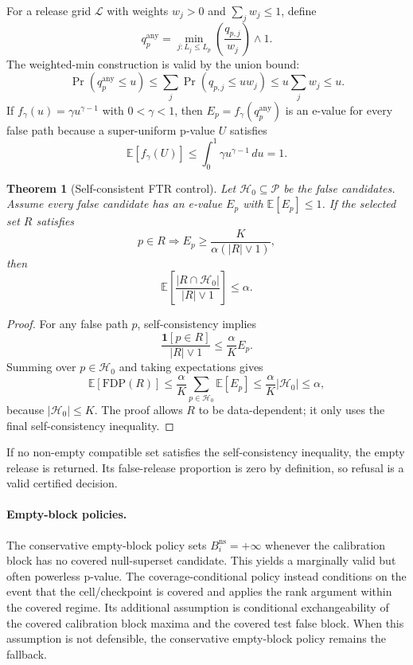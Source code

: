 \documentclass[11pt]{article}
\newtheorem{theorem}{Theorem}
\newcommand{\Pcal}{\mathcal P}
\newcommand{\Hcal}{\mathcal H}
\newcommand{\E}{\mathbb E}
\newcommand{\ind}{\mathbf 1}
\newcommand{\FDP}{\mathrm{FDP}}
\begin{document}
For a release grid \(\mathcal L\) with weights \(w_j>0\) and \(\sum_jw_j\le1\), define
\[
q_p^{\mathrm{any}}
=
\min_{j:L_j\le L_p}
\left(\frac{q_{p,j}}{w_j}\right)\wedge1 .
\]
The weighted-min construction is valid by the union bound:
\[
\Pr\!\left(q_p^{\mathrm{any}}\le u\right)
\le
\sum_j\Pr(q_{p,j}\le uw_j)
\le
u\sum_j w_j
\le u .
\]
If \(f_\gamma(u)=\gamma u^{\gamma-1}\) with \(0<\gamma<1\), then \(E_p=f_\gamma(q_p^{\mathrm{any}})\) is an e-value for every false path because a super-uniform p-value \(U\) satisfies
\[
\E[f_\gamma(U)]\le \int_0^1\gamma u^{\gamma-1}\,du=1 .
\]

\begin{theorem}[Self-consistent FTR control]
Let \(\Hcal_0\subseteq\Pcal\) be the false candidates.
Assume every false candidate has an e-value \(E_p\) with \(\E[E_p]\le1\).
If the selected set \(R\) satisfies
\[
p\in R\Rightarrow
E_p\ge \frac{K}{\alpha(|R|\vee1)},
\]
then
\[
\E\left[
\frac{|R\cap\Hcal_0|}{|R|\vee1}
\right]\le\alpha .
\]
\end{theorem}
\begin{proof}
For any false path \(p\), self-consistency implies
\[
\frac{\ind[p\in R]}{|R|\vee1}
\le
\frac{\alpha}{K}E_p .
\]
Summing over \(p\in\Hcal_0\) and taking expectations gives
\[
\E[\FDP(R)]
\le
\frac{\alpha}{K}\sum_{p\in\Hcal_0}\E[E_p]
\le
\frac{\alpha}{K}|\Hcal_0|
\le \alpha,
\]
because \(|\Hcal_0|\le K\).
The proof allows \(R\) to be data-dependent; it only uses the final self-consistency inequality.
\end{proof}

If no non-empty compatible set satisfies the self-consistency inequality, the empty release is returned.
Its false-release proportion is zero by definition, so refusal is a valid certified decision.

\paragraph{Empty-block policies.}
The conservative empty-block policy sets \(B_i^{\mathrm{ns}}=+\infty\) whenever the calibration block has no covered null-superset candidate.
This yields a marginally valid but often powerless p-value.
The coverage-conditional policy instead conditions on the event that the cell/checkpoint is covered and applies the rank argument within the covered regime.
Its additional assumption is conditional exchangeability of the covered calibration block maxima and the covered test false block.
When this assumption is not defensible, the conservative empty-block policy remains the fallback.
\end{document}

